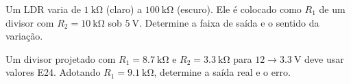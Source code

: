 \begin{questao}[2]{}

Um LDR varia de $\SI{1}{\kilo\ohm}$ (claro) a $\SI{100}{\kilo\ohm}$ (escuro).
Ele é colocado como $R_1$ de um divisor com $R_2=\SI{10}{\kilo\ohm}$ sob
$\SI{5}{\volt}$. Determine a faixa de saída e o sentido da variação.


\end{questao}
\begin{questao}[2]{}

Um divisor projetado com $R_1=\SI{8.7}{\kilo\ohm}$ e $R_2=\SI{3.3}{\kilo\ohm}$
para $12\to\SI{3.3}{\volt}$ deve usar valores E24. Adotando
$R_1=\SI{9.1}{\kilo\ohm}$, determine a saída real e o erro.


\end{questao}

